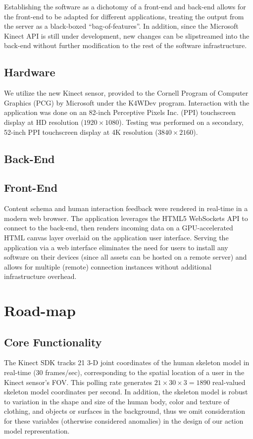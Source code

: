 \documentclass{scrartcl}
\begin{document}
    Establishing the software as a dichotomy of a front-end and back-end allows for the front-end to be adapted for different applications, treating the output from the server as a black-boxed ``bag-of-features''. In addition, since the Microsoft Kinect API is still under development, new changes can be slipstreamed into the back-end without further modification to the rest of the software infrastructure.
    \subsection{Hardware}
      We utilize the new Kinect sensor, provided to the Cornell Program of Computer Graphics (PCG) by Microsoft under the K4WDev program. Interaction with the application was done on an 82-inch Perceptive Pixels Inc. (PPI) touchscreen display at HD resolution ($1920 \times 1080$). Testing was performed on a secondary, 52-inch PPI touchscreen display at 4K resolution ($3840 \times 2160$).

    \subsection{Back-End}
    \subsection{Front-End}
      Content schema and human interaction feedback were rendered in real-time in a modern web browser. The application leverages the HTML5 WebSockets API to connect to the back-end, then renders incoming data on a GPU-accelerated HTML canvas layer overlaid on the application user interface. Serving the application via a web interface eliminates the need for users to install any software on their devices (since all assets can be hosted on a remote server) and allows for multiple (remote) connection instances without additional infrastructure overhead.

  \section{Road-map}
    \renewcommand{\thesubsection}{\Roman{subsection}}
    \subsection{Core Functionality\label{phase1}}
      The Kinect SDK tracks 21 3-D joint coordinates of the human skeleton model in real-time (30 frames/sec), corresponding to the spatial location of a user in the Kinect sensor's FOV. This polling rate generates $21 \times 30 \times 3 = 1890$ real-valued skeleton model coordinates per second. In addition, the skeleton model is robust to variation in the shape and size of the human body, color and texture of clothing, and objects or surfaces in the background, thus we omit consideration for these variables (otherwise considered anomalies) in the design of our action model representation.
\end{document}
